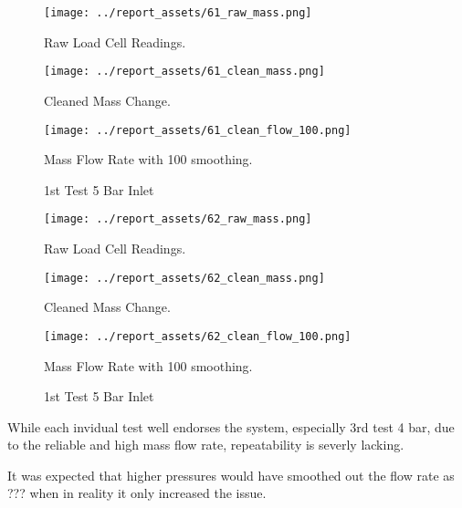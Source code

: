 \begin{figure}[htbp]
    \centering

    \begin{minipage}{0.3\textwidth}
        \centering
        \texttt{[image: ../report\_assets/61\_raw\_mass.png]}
        \caption*{Raw Load Cell Readings.}
    \end{minipage}
    \hfill
    \begin{minipage}{0.3\textwidth}
        \centering
        \texttt{[image: ../report\_assets/61\_clean\_mass.png]}
        \caption*{Cleaned Mass Change.}
    \end{minipage}
    \hfill
    \begin{minipage}{0.3\textwidth}
        \centering
        \texttt{[image: ../report\_assets/61\_clean\_flow\_100.png]}
        \caption*{Mass Flow Rate with 100 smoothing.}
    \end{minipage}
    \caption{1st Test 5 Bar Inlet}
    
\end{figure}\label{fig:61}

\begin{figure}[htbp]
    \centering

    \begin{minipage}{0.3\textwidth}
        \centering
        \texttt{[image: ../report\_assets/62\_raw\_mass.png]}
        \caption*{Raw Load Cell Readings.}
    \end{minipage}
    \hfill
    \begin{minipage}{0.3\textwidth}
        \centering
        \texttt{[image: ../report\_assets/62\_clean\_mass.png]}
        \caption*{Cleaned Mass Change.}
    \end{minipage}
    \hfill
    \begin{minipage}{0.3\textwidth}
        \centering
        \texttt{[image: ../report\_assets/62\_clean\_flow\_100.png]}
        \caption*{Mass Flow Rate with 100 smoothing.}
    \end{minipage}
    \caption{1st Test 5 Bar Inlet}
    
\end{figure}\label{fig:62}
While each invidual test well endorses the system, especially 3rd test 4 bar, due to the reliable and high mass flow rate, repeatability is severly lacking.

It was expected that higher pressures would have smoothed out the flow rate as ??? when in reality it only increased the issue. 